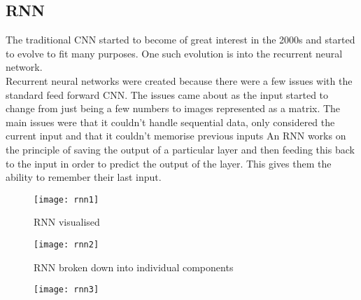 \documentclass{article}
\begin{document}
\subsection{RNN}
The traditional CNN started to become of great interest in the 2000s and started to evolve to fit
many purposes. One such evolution is into the recurrent neural network.\\
Recurrent neural networks were created because there were a few issues with the standard feed
forward CNN. The issues came about as the input started to change from just being a few
numbers to images represented as a matrix. The main issues were that it couldn’t handle
sequential data, only considered the current input and that it couldn't memorise previous inputs
An RNN works on the principle of saving the output of a particular layer and then feeding this
back to the input in order to predict the output of the layer. This gives them the ability to
remember their last input.\\
\begin{figure}[h!]
    \centering
    \texttt{[image: rnn1]}
    \caption{RNN visualised }
\end{figure}
\begin{figure}[h]
    \centering
    \texttt{[image: rnn2]}
    \caption{RNN broken down into individual components }
\end{figure}
\begin{figure}[h]
    \centering
    \texttt{[image: rnn3]}
    \caption{}
\end{figure}
\end{document}
